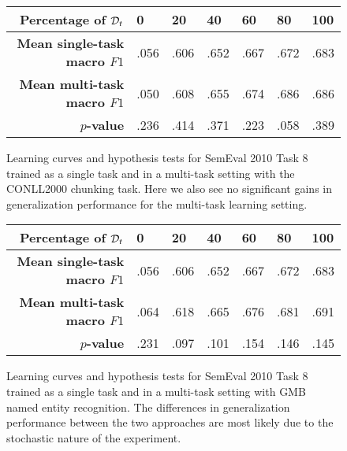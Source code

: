 \begin{figure}[h]
	\centering
	
	\vspace*{1cm}
	
	\begin{tabular}{r | l | l | l | l | l | l}
		\textbf{Percentage of $\mathcal{D}_t$} & 0 & 20 & 40 & 60 & 80 & 100 \\  \hline
		\textbf{Mean single-task macro $F1$} & .056 & .606 & .652 & .667 & .672 & .683\\
		\textbf{Mean multi-task macro $F1$} & .050 & .608 & .655 & .674 & .686  & .686\\
		$p$\textbf{-value} & .236  & .414 & .371 & .223 & .058 & .389
	\end{tabular}
	\caption{Learning curves and hypothesis tests for SemEval 2010 Task 8 trained as a single task and in a multi-task setting with the CONLL2000 chunking task. Here we also see no significant gains in generalization performance for the multi-task learning setting.}
\end{figure}
\begin{figure}[h]
	\centering
	
	\vspace*{1cm}
	
	\begin{tabular}{r | l | l | l | l | l | l}
		\textbf{Percentage of $\mathcal{D}_t$} & 0 & 20 & 40 & 60 & 80 & 100 \\  \hline
		\textbf{Mean single-task macro $F1$} & .056 & .606 & .652 & .667 & .672 & .683\\
		\textbf{Mean multi-task macro $F1$} & .064 & .618 & .665 & .676 & .681 & .691\\
		$p$\textbf{-value} & .231 & .097 & .101 & .154 & .146 & .145
	\end{tabular}
	\caption{Learning curves and hypothesis tests for SemEval 2010 Task 8 trained as a single task and in a multi-task setting with GMB named entity recognition. The differences in generalization performance between the two approaches are most likely due to the stochastic nature of the experiment.}
\end{figure}
\FloatBarrier
